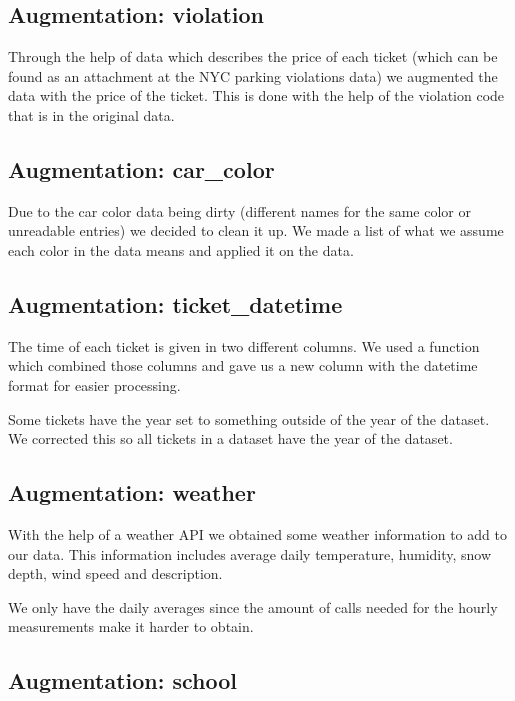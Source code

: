 \documentclass[12pt]{fphw}
\begin{document}
\subsection{Augmentation: violation}

Through the help of data which describes the price of each ticket (which can be found as an attachment at the NYC parking violations data\cite{violations-2021}) we augmented the data with the price of the ticket. This is done with the help of the violation code that is in the original data.

\subsection{Augmentation: car\_color}

Due to the car color data being dirty (different names for the same color or unreadable entries) we decided to clean it up. We made a list of what we assume each color in the data means and applied it on the data.

\subsection{Augmentation: ticket\_datetime}

The time of each ticket is given in two different columns. We used a function which combined those columns and gave us a new column with the datetime format for easier processing.

Some tickets have the year set to something outside of the year of the dataset. We corrected this so all tickets in a dataset have the year of the dataset.

\subsection{Augmentation: weather}

With the help of a weather API\cite{weatherr} we obtained some weather information to add to our data. This information includes average daily temperature, humidity, snow depth, wind speed and description.

We only have the daily averages since the amount of calls needed for the hourly measurements make it harder to obtain.



\subsection{Augmentation: school}
\end{document}
